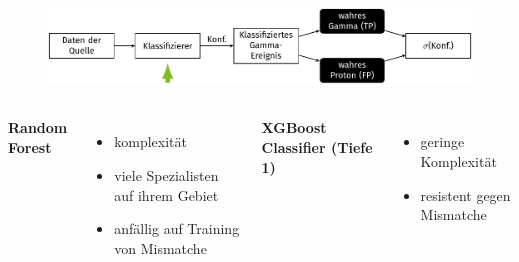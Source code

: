 \documentclass[aspectratio=1610, professionalfonts, 9pt]{beamer}
\begin{document}
\begin{frame}
  \begin{minipage}[t][0.3\textheight][t]{\textwidth}
	\begin{figure}
	  \includegraphics[scale=0.5]{./tikz/Conf/Conf2.pdf}
	\end{figure}
  \end{minipage}
  \begin{minipage}[t][0.7\textheight][t]{\textwidth}
	\begin{columns}[onlytextwidth]
	  \Large \bf Random Forest
	  \begin{itemize}
		\item komplexität
		\item viele Spezialisten auf ihrem Gebiet
		\item anfällig auf Training von Mismatche
	  \end{itemize}
	  \Large \bf XGBoost Classifier (Tiefe 1)
	  \begin{itemize}
		\item geringe Komplexität
		\item resistent gegen Mismatche
	  \end{itemize}
	\end{columns}
  \end{minipage}
\end{frame}
\end{document}
